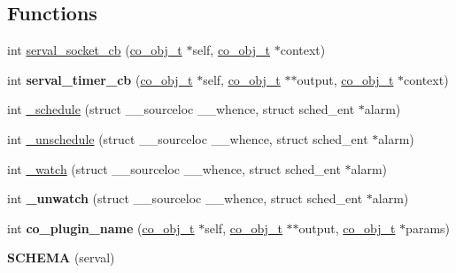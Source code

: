 \subsection*{Functions}
\begin{DoxyCompactItemize}
\item 
int \hyperlink{serval-dna_8c_a1555be4d16034b506577764fbd2cfb5d}{serval\-\_\-socket\-\_\-cb} (\hyperlink{structco__obj__t}{co\-\_\-obj\-\_\-t} $\ast$self, \hyperlink{structco__obj__t}{co\-\_\-obj\-\_\-t} $\ast$context)
\item 
\hypertarget{serval-dna_8c_a00d4df9eabb0ac594cc118143943392f}{int {\bfseries serval\-\_\-timer\-\_\-cb} (\hyperlink{structco__obj__t}{co\-\_\-obj\-\_\-t} $\ast$self, \hyperlink{structco__obj__t}{co\-\_\-obj\-\_\-t} $\ast$$\ast$output, \hyperlink{structco__obj__t}{co\-\_\-obj\-\_\-t} $\ast$context)}\label{serval-dna_8c_a00d4df9eabb0ac594cc118143943392f}

\item 
int \hyperlink{serval-dna_8c_ac6820e398043d975ed62c7ef795b4bb9}{\-\_\-schedule} (struct \-\_\-\-\_\-sourceloc \-\_\-\-\_\-whence, struct sched\-\_\-ent $\ast$alarm)
\item 
int \hyperlink{serval-dna_8c_a0ac6aba06cbf32257e8d8780e7e714d7}{\-\_\-unschedule} (struct \-\_\-\-\_\-sourceloc \-\_\-\-\_\-whence, struct sched\-\_\-ent $\ast$alarm)
\item 
int \hyperlink{serval-dna_8c_abdd84be4acf337a90ceac0a33493a41b}{\-\_\-watch} (struct \-\_\-\-\_\-sourceloc \-\_\-\-\_\-whence, struct sched\-\_\-ent $\ast$alarm)
\item 
\hypertarget{serval-dna_8c_a48af839503a9b8e7cdea4139c0df172e}{int {\bfseries \-\_\-unwatch} (struct \-\_\-\-\_\-sourceloc \-\_\-\-\_\-whence, struct sched\-\_\-ent $\ast$alarm)}\label{serval-dna_8c_a48af839503a9b8e7cdea4139c0df172e}

\item 
\hypertarget{serval-dna_8c_ab65e09211a66e5e4a54fcb0e963af7fe}{int {\bfseries co\-\_\-plugin\-\_\-name} (\hyperlink{structco__obj__t}{co\-\_\-obj\-\_\-t} $\ast$self, \hyperlink{structco__obj__t}{co\-\_\-obj\-\_\-t} $\ast$$\ast$output, \hyperlink{structco__obj__t}{co\-\_\-obj\-\_\-t} $\ast$params)}\label{serval-dna_8c_ab65e09211a66e5e4a54fcb0e963af7fe}

\item 
\hypertarget{serval-dna_8c_adc9141d5a1e77b476cdbbda5368d280b}{{\bfseries S\-C\-H\-E\-M\-A} (serval)}\label{serval-dna_8c_adc9141d5a1e77b476cdbbda5368d280b}


\end{DoxyCompactItemize}
